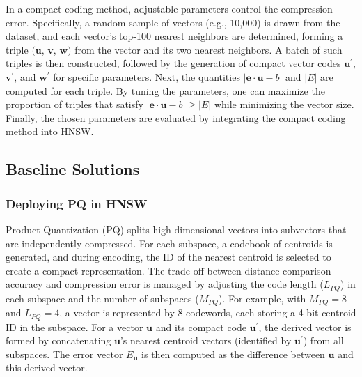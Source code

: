 {
In a compact coding method, adjustable parameters control the compression error. Specifically, a random sample of vectors (e.g., 10,000) is drawn from the dataset, and each vector's top-100 nearest neighbors are determined, forming a triple $(\boldsymbol{u}$, $\boldsymbol{v}$, $\boldsymbol{w})$ from the vector and its two nearest neighbors. A batch of such triples is then constructed, followed by the generation of compact vector codes $\boldsymbol{u}^{\prime}$, $\boldsymbol{v}^{\prime}$, and $\boldsymbol{w}^{\prime}$ for specific parameters. Next, the quantities $|\boldsymbol{e} \cdot \boldsymbol{u} - b|$ and $|E|$ are computed for each triple. By tuning the parameters, one can maximize the proportion of triples that satisfy $|\boldsymbol{e} \cdot \boldsymbol{u} - b| \geq |E|$ while minimizing the vector size. Finally, the chosen parameters are evaluated by integrating the compact coding method into HNSW.
}

\subsection{Baseline Solutions}
\label{subsec: baseline solutions}

\subsubsection{\textbf{Deploying PQ in HNSW}}
\label{subsubsec: HNSW PQ}
Product Quantization (PQ) \cite{PQ} splits high-dimensional vectors into subvectors that are independently compressed. For each subspace, a codebook of centroids is generated, and during encoding, the ID of the nearest centroid is selected to create a compact representation. The trade-off between distance comparison accuracy and compression error is managed by adjusting the code length ($L_{PQ}$) in each subspace and the number of subspaces ($M_{PQ}$). {For example, with $M_{PQ} = 8$ and $L_{PQ} = 4$, a vector is represented by 8 codewords, each storing a 4-bit centroid ID in the subspace. For a vector $\boldsymbol{u}$ and its compact code $\boldsymbol{u}^{\prime}$, the derived vector is formed by concatenating $\boldsymbol{u}$'s nearest centroid vectors (identified by $\boldsymbol{u}^{\prime}$) from all subspaces. The error vector $E_{\boldsymbol{u}}$ is then computed as the difference between $\boldsymbol{u}$ and this derived vector.}

